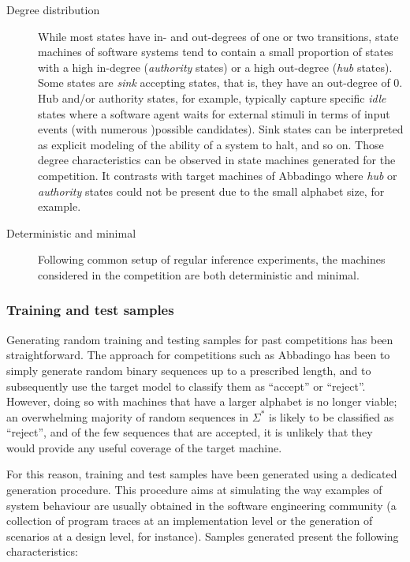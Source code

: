 \begin{description}
\item[Degree distribution] While most states have in- and out-degrees of one or two transitions, state machines of software systems tend to contain a small proportion of states with a high in-degree (\emph{authority} states) or a high out-degree (\emph{hub} states). Some states are \emph{sink} accepting states, that is, they have an out-degree of 0. Hub and/or authority states, for example, typically capture specific \emph{idle} states where a software agent waits for external stimuli in terms of input events (with numerous )possible candidates). Sink states can be interpreted as explicit modeling of the ability of a system to halt, and so on. Those degree characteristics can be observed in state machines generated for the competition. It contrasts with target machines of Abbadingo where \emph{hub} or \emph{authority} states could not be present due to the small alphabet size, for example.

\item[Deterministic and minimal] Following common setup of regular inference experiments, the machines considered in the competition are both deterministic and minimal.

\end{description}

\subsubsection*{Training and test samples}

Generating random training and testing samples for past competitions has been straightforward. The approach for competitions such as Abbadingo has been to simply generate random binary sequences up to a prescribed length, and to subsequently use the target model to classify them as ``accept'' or ``reject''. However, doing so with machines that have a larger alphabet is no longer viable; an overwhelming majority of random sequences in $\Sigma^{*}$ is likely to be classified as ``reject'', and of the few sequences that are accepted, it is unlikely that they would provide any useful coverage of the target machine. 

For this reason, training and test samples have been generated using a dedicated generation procedure. This procedure aims at simulating the way examples of system behaviour are usually obtained in the software engineering community (a collection of program traces at an implementation level or the generation of scenarios at a design level, for instance). Samples generated present the following characteristics:

